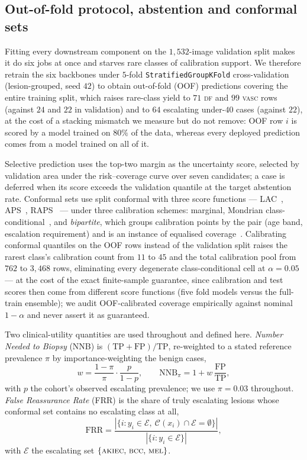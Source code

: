 \documentclass[journal]{IEEEtran}
\newcommand{\escset}{\{\textsc{akiec},\,\textsc{bcc},\,\textsc{mel}\}}
\begin{document}
\subsection{Out-of-fold protocol, abstention and conformal sets}
\label{sec:oof}
Fitting every downstream component on the $1{,}532$-image validation split makes it do six jobs
at once and starves rare classes of calibration support. We therefore retrain the six backbones
under $5$-fold \texttt{StratifiedGroupKFold} cross-validation (lesion-grouped, seed $42$) to
obtain out-of-fold (OOF) predictions covering the entire training split, which raises rare-class
yield to $71$ \textsc{df} and $99$ \textsc{vasc} rows (against $24$ and $22$ in validation) and
to $64$ escalating under-$40$ cases (against $22$), at the cost of a stacking mismatch we
measure but do not remove: OOF row $i$ is scored by a model trained on $80\%$ of the data,
whereas every deployed prediction comes from a model trained on all of it.

Selective prediction uses the top-two margin as the uncertainty score, selected by validation
area under the risk--coverage curve over seven candidates; a case is deferred when its score
exceeds the validation quantile at the target abstention rate. Conformal sets use split
conformal with three score functions --- LAC~\cite{sadinle2019lac}, APS~\cite{romano2020aps},
RAPS~\cite{angelopoulos2021raps} --- under three calibration schemes: marginal, Mondrian
class-conditional~\cite{vovk2012conditional}, and \emph{bipartite}, which groups calibration
points by the pair (age band, escalation requirement) and is an instance of equalised
coverage~\cite{romano2020equalized}. Calibrating conformal quantiles on the OOF rows instead of
the validation split raises the rarest class's calibration count from $11$ to $45$ and the
total calibration pool from $762$ to $3{,}468$ rows, eliminating every degenerate
class-conditional cell at $\alpha=0.05$ --- at the cost of the exact finite-sample guarantee,
since calibration and test scores then come from different score functions (five fold models
versus the full-train ensemble); we audit OOF-calibrated coverage empirically against nominal
$1-\alpha$ and never assert it as guaranteed.

Two clinical-utility quantities are used throughout and defined here. \emph{Number Needed to
Biopsy} (NNB) is $(\mathrm{TP}+\mathrm{FP})/\mathrm{TP}$, re-weighted to a stated reference
prevalence $\pi$ by importance-weighting the benign cases,
\begin{equation}
w = \frac{1-\pi}{\pi}\cdot\frac{p}{1-p}, \qquad
\mathrm{NNB}_{\pi} = 1 + w\,\frac{\mathrm{FP}}{\mathrm{TP}},
\label{eq:nnb}
\end{equation}
with $p$ the cohort's observed escalating prevalence; we use $\pi=0.03$ throughout. \emph{False
Reassurance Rate} (FRR) is the share of truly escalating lesions whose conformal set contains
no escalating class at all,
\begin{equation}
\mathrm{FRR} = \frac{|\{i : y_i \in \mathcal{E},\ \mathcal{C}(x_i)\cap\mathcal{E}=\emptyset\}|}
                    {|\{i : y_i \in \mathcal{E}\}|},
\label{eq:frr}
\end{equation}
with $\mathcal{E}$ the escalating set $\escset$.
\end{document}
